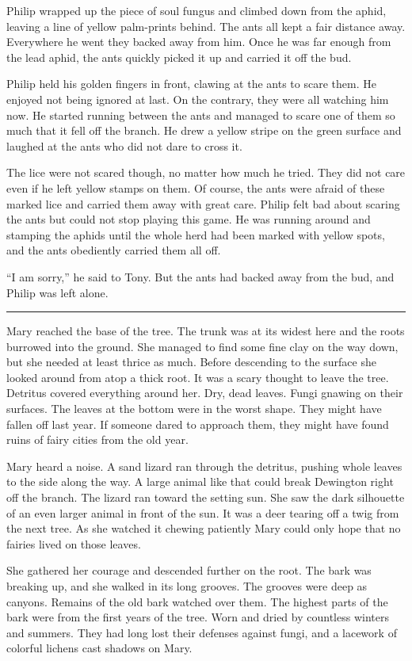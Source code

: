\documentclass[10pt]{memoir}
\renewcommand{\pfbreakdisplay}{\bigskip \ding{166} \bigskip}
\newcommand{\secbreak}{\fancybreak{\pfbreakdisplay}}
\begin{document}
Philip wrapped up the piece of soul fungus and climbed down from the aphid,
leaving a line of yellow palm-prints behind. The ants all kept a fair distance
away. Everywhere he went they backed away from him. Once he was far enough from
the lead aphid, the ants quickly picked it up and carried it off the bud.

Philip held his golden fingers in front, clawing at the ants to scare them.
He enjoyed not being ignored at last. On the contrary, they were all watching
him now. He started running between the ants and managed to scare one of them
so much that it fell off the branch. He drew a yellow stripe on the green
surface and laughed at the ants who did not dare to cross it.

The lice were not scared though, no matter how much he tried. They did not
care even if he left yellow stamps on them. Of course, the ants were afraid of
these marked lice and carried them away with great care. Philip felt bad about
scaring the ants but could not stop playing this game. He was running around
and stamping the aphids until the whole herd had been marked with yellow spots,
and the ants obediently carried them all off.

``I am sorry,'' he said to Tony. But the ants had backed away from the bud, and
Philip was left alone.

\secbreak

Mary reached the base of the tree. The trunk was at its widest here and the
roots burrowed into the ground. She managed to find some fine clay on the way
down, but she needed at least thrice as much. Before descending to the surface
she looked around from atop a thick root. It was a scary thought to leave the
tree. Detritus covered everything around her. Dry, dead leaves. Fungi gnawing
on their surfaces. The leaves at the bottom were in the worst shape. They might
have fallen off last year. If someone dared to approach them, they might have
found ruins of fairy cities from the old year.

Mary heard a noise. A sand lizard ran through the detritus, pushing whole
leaves to the side along the way. A large animal like that could break
Dewington right off the branch. The lizard ran toward the setting sun. She saw
the dark silhouette of an even larger animal in front of the sun. It was a
deer tearing off a twig from the next tree. As she watched it chewing
patiently Mary could only hope that no fairies lived on those leaves.

She gathered her courage and descended further on the root. The bark was
breaking up, and she walked in its long grooves. The grooves were deep as
canyons. Remains of the old bark watched over them. The highest parts of the
bark were from the first years of the tree. Worn and dried by countless winters
and summers. They had long lost their defenses against fungi, and a lacework of
colorful lichens cast shadows on Mary.
\end{document}
